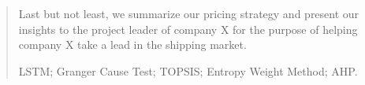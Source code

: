 \begin{abstract}
Last but not least, we summarize our pricing strategy and present our insights to the project leader of company X for the purpose of helping company X take a lead in the shipping market.
    
	\begin{keywords}
	\vspace{5pt}
	LSTM; Granger Cause Test; TOPSIS; Entropy Weight Method; AHP.
	\end{keywords}
\end{abstract}
